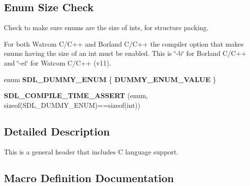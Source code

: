 \subsection*{Enum Size Check}
\label{_amgrp2cb9321d9d58e7b89760adf34c6da8cd}%
Check to make sure enums are the size of ints, for structure packing.

For both Watcom C/\+C++ and Borland C/\+C++ the compiler option that makes enums having the size of an int must be enabled. This is \char`\"{}-\/b\char`\"{} for Borland C/\+C++ and \char`\"{}-\/ei\char`\"{} for Watcom C/\+C++ (v11). \begin{DoxyCompactItemize}
\item 
enum {\bfseries S\+D\+L\+\_\+\+D\+U\+M\+M\+Y\+\_\+\+E\+N\+U\+M} \{ {\bfseries D\+U\+M\+M\+Y\+\_\+\+E\+N\+U\+M\+\_\+\+V\+A\+L\+U\+E}
 \}\label{_s_d_l__stdinc_8h_a723036ea05ccc4c35a5f16ac0465dd47}

\item 
{\bfseries S\+D\+L\+\_\+\+C\+O\+M\+P\+I\+L\+E\+\_\+\+T\+I\+M\+E\+\_\+\+A\+S\+S\+E\+R\+T} (enum, sizeof(S\+D\+L\+\_\+\+D\+U\+M\+M\+Y\+\_\+\+E\+N\+U\+M)==sizeof(int))\label{_s_d_l__stdinc_8h_ace52864a1a78abcd920187642767e881}

\end{DoxyCompactItemize}


\subsection{Detailed Description}
This is a general header that includes C language support. 



\subsection{Macro Definition Documentation}
